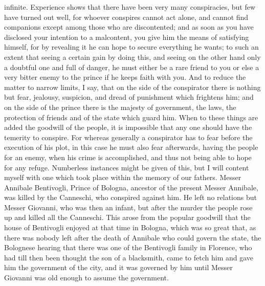 \documentclass[12pt,letterpaper]{memoir}
\begin{document}
infinite. Experience shows that there have been very many conspiracies,
but few have turned out well, for whoever conspires cannot act alone,
and cannot find companions except among those who are discontented;
and as soon as you have disclosed your intention to a malcontent, you
give him the means of satisfying himself, for by revealing it he can
hope to secure everything he wants; to such an extent that seeing
a certain gain by doing this, and seeing on the other hand only a
doubtful one and full of danger, he must either be a rare friend to
you or else a very bitter enemy to the prince if he keeps faith with
you. And to reduce the matter to narrow limits, I say, that on the side
of the conspirator there is nothing but fear, jealousy, suspicion,
and dread of punishment which frightens him; and on the side of the
prince there is the majesty of government, the laws, the protection
of friends and of the state which guard him. When to these things are
added the goodwill of the people, it is impossible that any one should
have the temerity to conspire. For whereas generally a conspirator
has to fear before the execution of his plot, in this case he must
also fear afterwards, having the people for an enemy, when his crime
is accomplished, and thus not being able to hope for any refuge.
Numberless instances might be given of this, but I will content myself
with one which took place within the memory of our fathers. Messer
Annibale Bentivogli, Prince of Bologna, ancestor of the present Messer
Annibale, was killed by the Canneschi, who conspired against him. He
left no relations but Messer Giovanni, who was then an infant, but
after the murder the people rose up and killed all the Canneschi. This
arose from the popular goodwill that the house of Bentivogli enjoyed at
that time in Bologna, which was so great that, as there was nobody left
after the death of Annibale who could govern the state, the Bolognese
hearing that there was one of the Bentivogli family in Florence, who
had till then been thought the son of a blacksmith, came to fetch him
and gave him the government of the city, and it was governed by him
until Messer Giovanni was old enough to assume the government.
\end{document}
